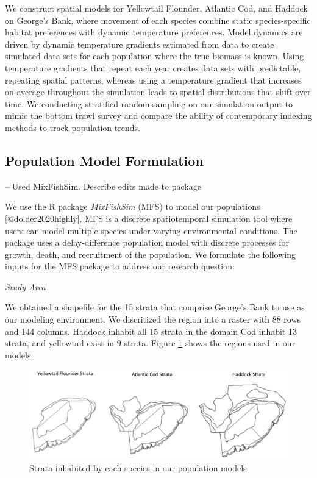 \documentclass[
  12pt,
]{article}
\begin{document}
We construct spatial models for Yellowtail Flounder, Atlantic Cod, and Haddock on George's Bank, where movement of each species combine static species-specific habitat preferences with dynamic temperature preferences. Model dynamics are driven by dynamic temperature gradients estimated from data to create simulated data sets for each population where the true biomass is known. Using temperature gradients that repeat each year creates data sets with predictable, repeating spatial patterns, whereas using a temperature gradient that increases on average throughout the simulation leads to spatial distributions that shift over time. We conducting stratified random sampling on our simulation output to mimic the bottom trawl survey and compare the ability of contemporary indexing methods to track population trends.

\subsection{Population Model Formulation}

-- Used MixFishSim. Describe edits made to package

We use the R package \emph{MixFishSim} (MFS) to model our populations {[}@dolder2020highly{]}. MFS is a discrete spatiotemporal simulation tool where users can model multiple species under varying environmental conditions. The package uses a delay-difference population model with discrete processes for growth, death, and recruitment of the population. We formulate the following inputs for the MFS package to address our research question:

\emph{Study Area}

We obtained a shapefile for the 15 strata that comprise George's Bank to use as our modeling environment. We discritized the region into a raster with 88 rows and 144 columns. Haddock inhabit all 15 strata in the domain Cod inhabit 13 strata, and yellowtail exist in 9 strata. Figure \ref{fig:strata-plot} shows the regions used in our models.

\begin{figure}

{\centering \includegraphics[width=0.95\linewidth]{Images/Strata} 

}

\caption{Strata inhabited by each species in our population models.}\label{fig:strata-plot}
\end{figure}
\end{document}
